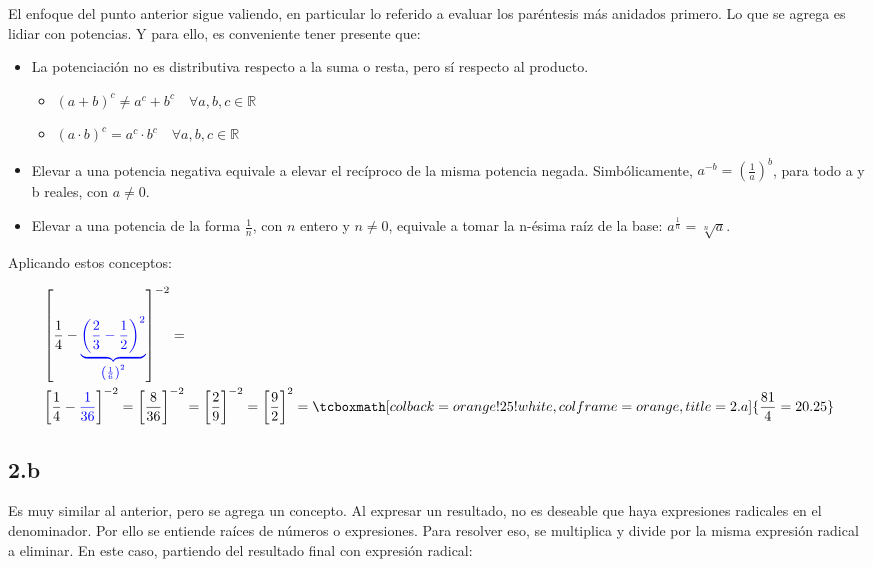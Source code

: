 \documentclass{article}
\newcommand{\hresult}[2]{\tcboxmath[colback=orange!25!white,colframe=orange, title=#1] {#2} }
\begin{document}
El enfoque del punto anterior sigue valiendo, en particular lo referido a evaluar los paréntesis más anidados primero. Lo que se agrega es lidiar con potencias. Y para ello, es conveniente tener presente que:

\begin{itemize}
\item La potenciación no es distributiva respecto a la suma o resta, pero sí respecto al producto.
\begin{itemize}
\renewcommand{\labelitemii}{$\diamond$}
\item $\left(a + b\right)^c \neq a^c + b^c \quad \forall a,b,c \in \mathbb{R}$
\item $\left(a \cdot b\right)^c = a^c \cdot b^c \quad \forall a,b,c \in \mathbb{R}$
\end{itemize}
\item Elevar a una potencia negativa equivale a elevar el recíproco de la misma potencia negada. Simbólicamente, $a^{-b} = \left( \frac{1}{a} \right)^b$, para todo a y b reales, con $a \neq 0$.
\item Elevar a una potencia de la forma $\frac{1}{n}$, con $n$ entero y $n \neq 0$, equivale a tomar la n-ésima raíz de la base: $a^{\frac{1}{n}} = \sqrt[n]{a}$.
\end{itemize}

Aplicando estos conceptos:

\begin{subequations}
\begin{align}
&\left[ \frac{1}{4} - \textcolor{blue}{ \underbrace{ \left( \frac{2}{3} - \frac{1}{2} \right)^2 }_{\left( \frac{1}{6} \right)^2 }} \right]^{-2} = \\
&\left[ \frac{1}{4} - \textcolor{blue}{ \frac{1}{36} } \right]^{-2} = \left[ \frac{8}{36} \right]^{-2} = \left[ \frac{2}{9} \right]^{-2} = \left[ \frac{9}{2} \right]^2 = \hresult{2.a} { \frac{81}{4} = 20.25 }
\end{align}
\end{subequations}

\subsection*{2.b}
\label{subsec:2.b}

Es muy similar al anterior, pero se agrega un concepto. Al expresar un resultado, no es deseable que haya expresiones radicales en el denominador. Por ello se entiende raíces de números o expresiones. Para resolver eso, se multiplica y divide por la misma expresión radical a eliminar. En este caso, partiendo del resultado final con expresión radical:
\end{document}

